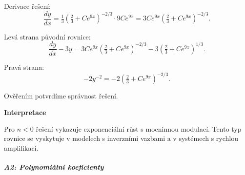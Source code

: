 \begin{example}
    Derivace řešení:
    \[
    \frac{dy}{dx} = \tfrac{1}{3}\left(\tfrac{2}{3} + Ce^{9x}\right)^{-2/3} \cdot 9Ce^{9x} = 3Ce^{9x}\left(\tfrac{2}{3} + Ce^{9x}\right)^{-2/3}.
    \]
    
    Levá strana původní rovnice:
    \[
    \frac{dy}{dx} - 3y = 3Ce^{9x}\left(\tfrac{2}{3} + Ce^{9x}\right)^{-2/3} - 3\left(\tfrac{2}{3} + Ce^{9x}\right)^{1/3}.
    \]
    
    Pravá strana:
    \[
    -2y^{-2} = -2\left(\tfrac{2}{3} + Ce^{9x}\right)^{-2/3}.
    \]
    
    Ověřením potvrdíme správnost řešení.
    
    \vspace{1.5\baselineskip}
    
    \noindent\textbf{Interpretace}
    
    Pro $n < 0$ řešení vykazuje exponenciální růst s mocninnou modulací. Tento typ rovnice se vyskytuje v modelech s inverzními vazbami a v systémech s rychlou amplifikací.
    
    \end{example}

\vspace{0.8\baselineskip}

\subparagraph*{A2: Polynomiální koeficienty}
\label{subpar:l2-a2-polynomialni-koeficienty}

